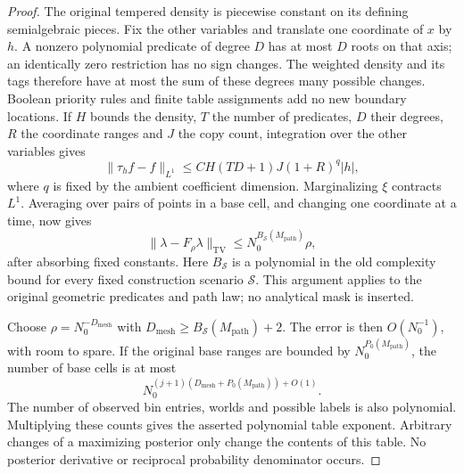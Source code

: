 \begin{proof}
The original tempered density is piecewise constant on its defining
semialgebraic pieces.  Fix the other variables and translate one coordinate of \(x\) by \(h\).
A nonzero polynomial predicate of degree \(D\) has at most \(D\) roots
on that axis; an identically zero restriction has no sign changes.
The weighted density and its tags therefore have at most the sum of
these degrees many possible changes.  Boolean priority rules and
finite table assignments add no new boundary locations.  If \(H\)
bounds the density, \(T\) the number of predicates, \(D\) their degrees,
\(R\) the coordinate ranges and \(J\) the copy count, integration over
the other variables gives
\begin{equation}
\|\tau_h f-f\|_{L^1}
 \le C H(TD+1)J(1+R)^q |h|,
 \label{a03:axis-variation}
\end{equation}
where \(q\) is fixed by the ambient coefficient dimension.  Marginalizing
\(\xi\) contracts \(L^1\).  Averaging over pairs of points in a base cell,
and changing one coordinate at a time, now gives
\begin{equation}
\|\lambda-F_\rho\lambda\|_{\mathrm{TV}}
 \le N_0^{B_{\mathcal S}(M_{\mathrm{path}})}\rho ,
 \label{a03:joint-tv}
\end{equation}
after absorbing fixed constants.  Here \(B_{\mathcal S}\) is a
polynomial in the old complexity bound for every fixed construction
scenario \(\mathcal S\).  This argument applies to the original
geometric predicates and path law; no analytical mask is inserted.

Choose \(\rho=N_0^{-D_{\mathrm{mesh}}}\) with
\(D_{\mathrm{mesh}}\ge B_{\mathcal S}(M_{\mathrm{path}})+2\).
The error is then \(O(N_0^{-1})\), with room to spare.  If the original
base ranges are bounded by \(N_0^{P_0(M_{\mathrm{path}})}\), the number
of base cells is at most
\begin{equation}
N_0^{(j+1)(D_{\mathrm{mesh}}+P_0(M_{\mathrm{path}}))+O(1)}.
\end{equation}
The number of observed bin entries, worlds and possible labels is
also polynomial.  Multiplying these counts gives the asserted
polynomial table exponent.  Arbitrary changes of a maximizing
posterior only change the contents of this table.  No posterior
derivative or reciprocal probability denominator occurs.
\end{proof}


